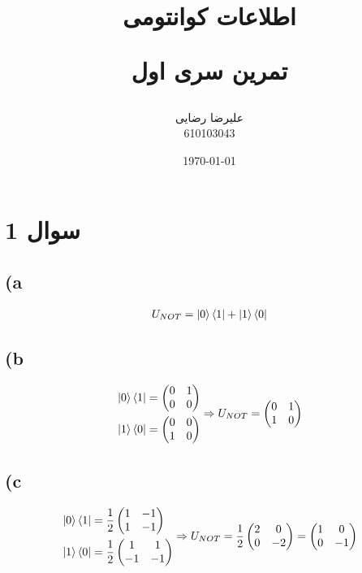 \documentclass{article}
\title{
    اطلاعات کوانتومی
    
    تمرین سری اول 
}
\author{
    علیرضا رضایی
    \\
    610103043
}
\date{
    \today
}
\begin{document}
\maketitle

\section*{
 سوال 1   
}

\subsection*{(a}
\begin{align*}
U_{NOT} = \ket{0}\bra{1} + \ket{1}\bra{0}
\end{align*}

\subsection*{(b}
\begin{align*}
    \begin{aligned}        
        &\ket{0}\bra{1} =\begin{pmatrix}
            0 & 1\\
            0 & 0
        \end{pmatrix}\\
        &\ket{1}\bra{0} = \begin{pmatrix}
            0 & 0\\
            1 & 0
        \end{pmatrix}
    \end{aligned}
    \Rightarrow U_{NOT} = \begin{pmatrix}
        0 & 1\\
        1 & 0
    \end{pmatrix}
\end{align*}

\subsection*{(c}
\begin{align*}
    \begin{aligned}        
        &\ket{0}\bra{1} = \frac{1}{2}\begin{pmatrix}
            1 & -1\\
            1 & -1
        \end{pmatrix}\\
        &\ket{1}\bra{0} = \frac{1}{2}\begin{pmatrix}
            1 & 1\\
            -1 & -1
        \end{pmatrix}
    \end{aligned}
    \Rightarrow U_{NOT} = \frac{1}{2}\begin{pmatrix}
        2 & 0\\
        0 & -2
    \end{pmatrix} = \begin{pmatrix}
        1 & 0\\
        0 & -1
    \end{pmatrix}
\end{align*}
\end{document}
